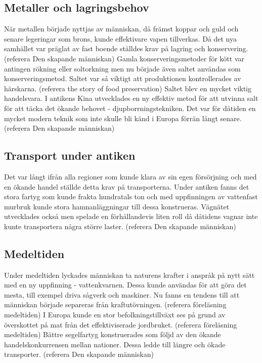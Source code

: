 \subsection{Metaller och lagringsbehov}
När metallen började nyttjas av människan, då främst koppar och guld och senare legeringar som brons, kunde effektivare vapen tillverkas.   
\newline
\newline 
Då det nya samhället var präglat av fast boende ställdes krav på lagring och konservering. (referera Den skapande människan) 
\newline
\newline
Gamla konserveringsmetoder för kött var antingen rökning eller soltorkning men nu började även saltet användas som konserveringsmetod. Saltet var så viktigt att produktionen kontrollerades av härskarna. 
(referera the story of food preservation) 
\newline
\newline
Saltet blev en mycket viktig handelsvara. I antikens Kina utvecklades en ny effektiv metod för att utvinna salt för att täcka det ökande behovet - djupborrningstekniken. Det var för dåtiden en mycket modern teknik som inte skulle bli känd i Europa förrän långt senare. (referera Den skapande människan)

\subsection{Transport under antiken}
Det var långt ifrån alla regioner som kunde klara av sin egen försörjning och med en ökande handel ställde detta krav på transporterna. Under antiken fanns det stora fartyg som kunde frakta hundratals ton och med uppfinningen av vattenfast murbruk kunde stora hamnanläggningar till dessa konstrueras. Vägnätet utvecklades också men spelade en förhållandevis liten roll då dåtidens vagnar inte kunte transportera några större laster. (referera Den skapande människan)

\subsection{Medeltiden}    
Under medeltiden lyckades människan ta naturens krafter i anspråk på nytt sätt med en ny uppfinning - vattenkvarnen. Dessa kunde användas för att göra det mesta, till exempel driva sågverk och maskiner. Nu fanns en tendens till att människan började separeras från kraftutövningen. (referera föreläsning medeltiden) 
\newline
\newline
I Europa kunde en stor befolkningstillväxt ses på grund av överskottet på mat från det effektiviserade jordbruket. (referera föreläsning medeltiden)
\newline
\newline
Bättre segelfartyg konstruerades som följd av den ökande handelskonkurrensen mellan nationer. Dessa ledde till längre och ökade transporter. (referera Den skapande människan)
 
